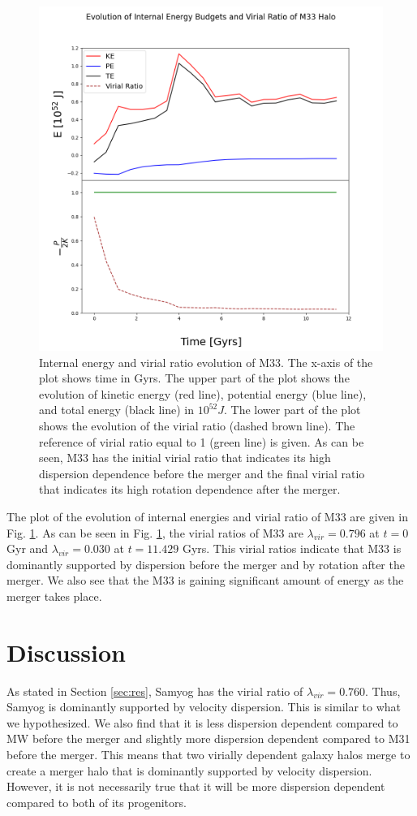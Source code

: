 \documentclass[twocolumn]{aastex631}
\begin{document}
\begin{figure}[htbp]
\includegraphics[width=.5\textwidth]{M33_energies_virial_ratios.png}
\caption{Internal energy and virial ratio evolution of M33. The x-axis of the plot shows time in Gyrs. The upper part of the plot shows the evolution of kinetic energy (red line), potential energy (blue line), and total energy (black line) in $10^{52} J$. The lower part of the plot shows the evolution of the virial ratio (dashed brown line). The reference of virial ratio equal to 1 (green line) is given. As can be seen, M33 has the initial virial ratio that indicates its high dispersion dependence before the merger and the final virial ratio that indicates its high rotation dependence after the merger.
\label{fig:M33_plot}}
\end{figure}

The plot of the evolution of internal energies and virial ratio of M33 are given in Fig. \ref{fig:M33_plot}. As can be seen in Fig. \ref{fig:M33_plot}, the virial ratios of M33 are $\lambda_{vir} = 0.796$ at $t=0$ Gyr and $\lambda_{vir} = 0.030$ at $t=11.429$ Gyrs. This virial ratios indicate that M33 is dominantly supported by dispersion before the merger and by rotation after the merger. We also see that the M33 is gaining significant amount of energy as the merger takes place. 

\section{Discussion}
\label{sec:disc}
As stated in Section \ref{sec:res}, Samyog has the virial ratio of $\lambda_{vir} = 0.760$. Thus, Samyog is dominantly supported by velocity dispersion. This is similar to what we hypothesized. We also find that it is less dispersion dependent compared to MW before the merger and slightly more dispersion dependent compared to M31 before the merger. This means that two virially dependent galaxy halos merge to create a merger halo that is dominantly supported by velocity dispersion. However, it is not necessarily true that it will be more dispersion dependent compared to both of its progenitors. 
\end{document}
